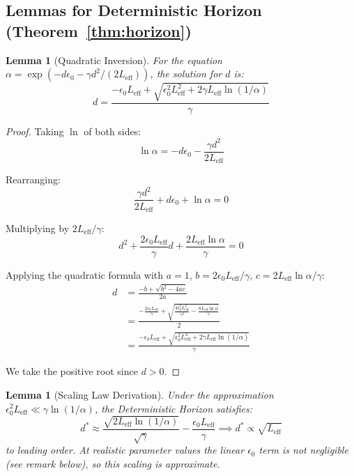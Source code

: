 \documentclass{article}
\theoremstyle{plain}
\newtheorem{lemma}[theorem]{Lemma}
\theoremstyle{definition}
\theoremstyle{remark}
\newcommand{\Leff}{L_{\mathrm{eff}}}
\begin{document}
\subsection{Lemmas for Deterministic Horizon (Theorem~\ref{thm:horizon})}

\begin{lemma}[Quadratic Inversion]
\label{lem:quadratic}
For the equation $\alpha = \exp(-d\epsilon_0 - \gamma d^2/(2\Leff))$, the solution for $d$ is:
\begin{equation}
d = \frac{-\epsilon_0 \Leff + \sqrt{\epsilon_0^2 \Leff^2 + 2\gamma \Leff \ln(1/\alpha)}}{\gamma}
\end{equation}
\end{lemma}

\begin{proof}
Taking $\ln$ of both sides:
\begin{equation}
\ln \alpha = -d\epsilon_0 - \frac{\gamma d^2}{2\Leff}
\end{equation}

Rearranging:
\begin{equation}
\frac{\gamma d^2}{2\Leff} + d\epsilon_0 + \ln \alpha = 0
\end{equation}

Multiplying by $2\Leff/\gamma$:
\begin{equation}
d^2 + \frac{2\epsilon_0 \Leff}{\gamma} d + \frac{2\Leff \ln \alpha}{\gamma} = 0
\end{equation}

Applying the quadratic formula with $a=1$, $b=2\epsilon_0 \Leff/\gamma$, $c=2\Leff\ln\alpha/\gamma$:
\begin{align}
d &= \frac{-b + \sqrt{b^2 - 4ac}}{2a} \\
&= \frac{-\frac{2\epsilon_0 \Leff}{\gamma} + \sqrt{\frac{4\epsilon_0^2 \Leff^2}{\gamma^2} - \frac{8\Leff \ln \alpha}{\gamma}}}{2} \\
&= \frac{-\epsilon_0 \Leff + \sqrt{\epsilon_0^2 \Leff^2 + 2\gamma \Leff \ln(1/\alpha)}}{\gamma}
\end{align}

We take the positive root since $d > 0$.
\end{proof}

\begin{lemma}[Scaling Law Derivation]
\label{lem:scaling}
Under the approximation $\epsilon_0^2 \Leff \ll \gamma \ln(1/\alpha)$, the Deterministic Horizon satisfies:
\begin{equation}
d^* \approx \frac{\sqrt{2\Leff \ln(1/\alpha)}}{\sqrt{\gamma}} - \frac{\epsilon_0 \Leff}{\gamma} \implies d^* \propto \sqrt{\Leff}
\end{equation}
to leading order. At realistic parameter values the linear $\epsilon_0$ term is not negligible (see remark below), so this scaling is approximate.
\end{lemma}
\end{document}
